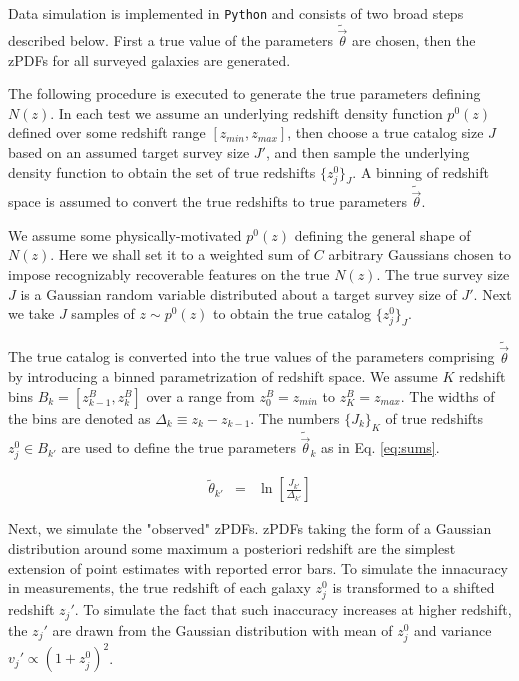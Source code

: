 \documentclass[preprint]{aastex}
\begin{document}
Data simulation is implemented in \texttt{Python} and consists of two broad 
steps described below.  First a true value of the parameters 
$\tilde{\vec{\theta}}$ are chosen, then the zPDFs for all surveyed galaxies are 
generated.  

The following procedure is executed to generate the true parameters defining 
$N(z)$.  In each test we assume an underlying redshift density function 
$p^{0}(z)$ defined over some redshift range $[z_{min},z_{max}]$, then choose a 
true catalog size $J$ based on an assumed target survey size $J'$, and then 
sample the underlying density function to obtain the set of true redshifts 
$\{z_{j}^{0}\}_{J}$.  A binning of redshift space is assumed to convert the 
true redshifts to true parameters $\tilde{\vec{\theta}}$.

We assume some physically-motivated $p^{0}(z)$ defining the general shape of 
$N(z)$.  Here we shall set it to a weighted sum of $C$ arbitrary Gaussians 
chosen to impose recognizably recoverable features on the true $N(z)$.  The 
true survey size $J$ is a Gaussian random variable distributed about a target 
survey size of $J'$.  Next we take $J$ samples of $z\sim p^{0}(z)$ to obtain 
the true catalog $\{z_{j}^{0}\}_{J}$.  

The true catalog is converted into the true values of the parameters comprising 
$\tilde{\vec{\theta}}$ by introducing a binned parametrization of redshift 
space.  We assume $K$ redshift bins $B_{k}=[z^{B}_{k-1},z^{B}_{k}]$ over a 
range from $z^{B}_{0}=z_{min}$ to $z^{B}_{K}=z_{max}$.  The widths of the bins 
are denoted as $\Delta_{k}\equiv z_{k}-z_{k-1}$.  The numbers $\{J_{k}\}_{K}$ 
of true redshifts $z^{0}_{j}\in B_{k'}$ are used to define the true parameters 
$\tilde{\vec{\theta}}_{k}$ as in Eq. \ref{eq:sums}.

\begin{eqnarray}
\label{eq:sums}
\tilde{\theta}_{k'} &=& \ln\left[\frac{J_{k'}}{\Delta_{k'}}\right]
\end{eqnarray}

Next, we simulate the "observed" zPDFs.  zPDFs taking the form of a Gaussian 
distribution around some maximum a posteriori redshift are the simplest 
extension of point estimates with reported error bars.  To simulate the 
innacuracy in measurements, the true redshift of each galaxy $z_{j}^{0}$ is 
transformed to a shifted redshift $z_{j}'$.  To simulate the fact that such 
inaccuracy increases at higher redshift, the $z_{j}'$ are drawn from the 
Gaussian distribution with mean of $z_{j}^{0}$ and variance 
$v_{j}'\propto(1+z_{j}^{0})^{2}$.
\end{document}
